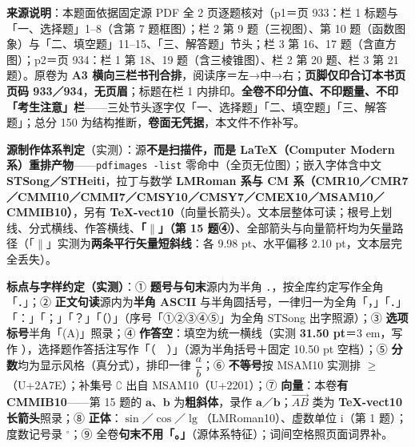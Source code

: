 


\begin{gktip}
\textbf{来源说明}：本题面依据固定源 PDF 全 2 页逐题核对（p1＝页 933：栏 1 标题与「一、选择题」1–8（含第 7 题框图）；栏 2 第 9 题（三视图）、第 10 题（函数图象）与「二、填空题」11–15、「三、解答题」节头；栏 3 第 16、17 题（含直方图）；p2＝页 934：栏 1 第 18、19 题（含三棱锥图）、栏 2 第 20 题、栏 3 第 21 题）。原卷为 \textbf{A3 横向三栏书刊合排}，阅读序＝左→中→右；\textbf{页脚仅印合订本书页页码 933／934}，\textbf{无页眉}；标题在栏 1 内排印。\textbf{全卷不印分值、不印题量、不印「考生注意」栏}——三处节头逐字仅「一、选择题」「二、填空题」「三、解答题」；总分 150 为结构推断，\textbf{卷面无凭据}，本文件不作补写。

\textbf{源制作体系判定}（实测）：源\textbf{不是扫描件，而是 LaTeX（Computer Modern 系）重排产物}——\texttt{pdfimages -list} 零命中（全页无位图）；嵌入字体含中文 \textbf{STSong／STHeiti}，拉丁与数学 \textbf{LMRoman 系与 CM 系（CMR10／CMR7／CMMI10／CMMI7／CMSY10／CMSY7／CMEX10／MSAM10／CMMIB10）}，另有 \textbf{TeX-vect10}（向量长箭头）。文本层整体可读；根号上划线、分式横线、作答横线、\textbf{「$\parallel$」（第 15 题④）}、全部箭头与向量箭杆均为矢量路径（「$\parallel$」实测为\textbf{两条平行矢量短斜线}：各 9.98 pt、水平偏移 2.10 pt，文本层完全丢失）。

\textbf{标点与字样约定（实测）}：① \textbf{题号与句末}源内为半角 \texttt{.}，按全库约定写作全角「．」；② \textbf{正文句读}源内为\textbf{半角 ASCII} 与半角圆括号，一律归一为全角「，」「．」「：」「；」「？」「（）」（序号「①②③④⑤」为全角 STSong 出字照源）；③ \textbf{选项标号}半角「(A)」照录；④ \textbf{作答空}：填空为统一横线（实测 \textbf{31.50 pt}＝3 em，写作 \texttt{\gkblank{}}），选择题作答括注写作「（　）」（源为半角括号＋固定 10.50 pt 空档）；⑤ \textbf{分数}均为显示风格（真分式），排印一律 \(\dfrac{a}{b}\)；⑥ \textbf{不等号}按 MSAM10 实测排 \(\geqslant\)（U+2A7E）；补集号 \(\complement\) 出自 MSAM10（U+2201）；⑦ \textbf{向量}：本卷\textbf{有 CMMIB10}——第 15 题的 \(\boldsymbol{a}\)、\(\boldsymbol{b}\) 为\textbf{粗斜体}，录作 \(\boldsymbol{a}\)／\(\boldsymbol{b}\)；\(\overrightarrow{AB}\) 类为 \textbf{TeX-vect10 长箭头}照录；⑧ \textbf{正体}：\(\sin\)／\(\cos\)／\(\lg\)（LMRoman10）、虚数单位 \(\mathrm{i}\)（第 1 题）；度数记号录 \(^{\circ}\)；⑨ 全卷\textbf{句末不用「。」}（源体系特征）；词间空格照页面词界补。


\end{gktip}
